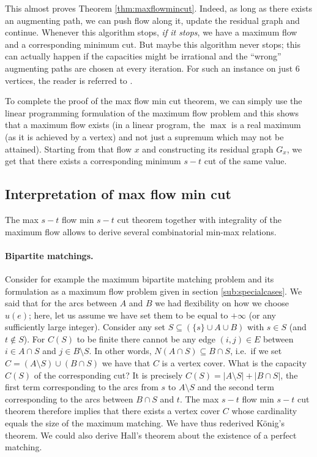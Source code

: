 \documentclass[12pt]{article}
\begin{document}
This almost proves Theorem \ref{thm:maxflowmincut}. Indeed, as long as
there exists an augmenting path, we can push flow along it, update the
residual graph and continue. Whenever this algorithm stops, {\it if
  it stops}, we have a maximum flow and a corresponding minimum
cut. But maybe this algorithm never stops; this can actually happen if
the capacities might be irrational and the ``wrong'' augmenting paths
are chosen at every iteration. For such an instance on just 6 vertices, the reader is referred to \cite{Zwick95}. 

To complete the proof of the max flow
min cut theorem, we can simply use the linear programming
formulation of the maximum flow problem and this shows that a maximum
flow exists (in a linear program, the $\max$ is a real maximum (as it
is achieved by a vertex) and not
just a supremum which may not be attained). Starting from that flow $x$
and constructing its residual graph $G_x$, we get that there exists a
corresponding minimum $s-t$ cut of the same value. 

       
 
\subsection{Interpretation of max flow min cut}  
The max $s-t$ flow min $s-t$ cut theorem together with integrality of
the maximum flow allows to derive several combinatorial min-max
relations. 

\paragraph{Bipartite matchings.} Consider for example the maximum
bipartite matching problem and its formulation as a maximum flow
problem given in section \ref{sub:specialcases}. We said that for the
arcs between $A$ and $B$ we had flexibility on how we choose $u(e)$;
here, let us assume we have set them to be equal to $+\infty$ (or any
sufficiently large integer). Consider any set $S\subseteq (\{s\}\cup
A\cup B)$ with $s\in S$ (and
$t\notin S$). For $C(S)$ to be finite there cannot be any edge
$(i,j)\in E$ between
$i\in A\cap S$ and $j\in B\setminus S$. In other words, $N(A\cap S)
\subseteq B\cap S$, i.e.\ if we set $C=(A\setminus S)\cup (B\cap S)$
we have that $C$ is a vertex cover. What is the capacity $C(S)$ of the
corresponding cut? It is precisely $C(S)=|A\setminus S| + |B\cap S|$,
the first term corresponding to the arcs from $s$ to $A\setminus S$
and the second term corresponding to the arcs between $B\cap S$ and
$t$. The max $s-t$ flow min $s-t$ cut theorem therefore implies that
there exists a vertex cover $C$ whose cardinality equals the size of
the maximum matching. We have thus rederived K\"onig's theorem. We
could also  derive Hall's theorem about the existence of a perfect
matching.
\end{document}
